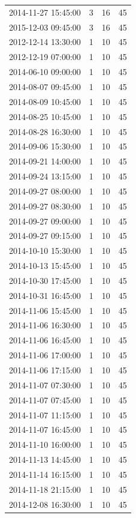 \begin{tabular}{lrrr}
2014-11-27 15:45:00 & 3 & 16 & 45 \\
2015-12-03 09:45:00 & 3 & 16 & 45 \\
2012-12-14 13:30:00 & 1 & 10 & 45 \\
2012-12-19 07:00:00 & 1 & 10 & 45 \\
2014-06-10 09:00:00 & 1 & 10 & 45 \\
2014-08-07 09:45:00 & 1 & 10 & 45 \\
2014-08-09 10:45:00 & 1 & 10 & 45 \\
2014-08-25 10:45:00 & 1 & 10 & 45 \\
2014-08-28 16:30:00 & 1 & 10 & 45 \\
2014-09-06 15:30:00 & 1 & 10 & 45 \\
2014-09-21 14:00:00 & 1 & 10 & 45 \\
2014-09-24 13:15:00 & 1 & 10 & 45 \\
2014-09-27 08:00:00 & 1 & 10 & 45 \\
2014-09-27 08:30:00 & 1 & 10 & 45 \\
2014-09-27 09:00:00 & 1 & 10 & 45 \\
2014-09-27 09:15:00 & 1 & 10 & 45 \\
2014-10-10 15:30:00 & 1 & 10 & 45 \\
2014-10-13 15:45:00 & 1 & 10 & 45 \\
2014-10-30 17:45:00 & 1 & 10 & 45 \\
2014-10-31 16:45:00 & 1 & 10 & 45 \\
2014-11-06 15:45:00 & 1 & 10 & 45 \\
2014-11-06 16:30:00 & 1 & 10 & 45 \\
2014-11-06 16:45:00 & 1 & 10 & 45 \\
2014-11-06 17:00:00 & 1 & 10 & 45 \\
2014-11-06 17:15:00 & 1 & 10 & 45 \\
2014-11-07 07:30:00 & 1 & 10 & 45 \\
2014-11-07 07:45:00 & 1 & 10 & 45 \\
2014-11-07 11:15:00 & 1 & 10 & 45 \\
2014-11-07 16:45:00 & 1 & 10 & 45 \\
2014-11-10 16:00:00 & 1 & 10 & 45 \\
2014-11-13 14:45:00 & 1 & 10 & 45 \\
2014-11-14 16:15:00 & 1 & 10 & 45 \\
2014-11-18 21:15:00 & 1 & 10 & 45 \\
2014-12-08 16:30:00 & 1 & 10 & 45 \\

\end{tabular}
